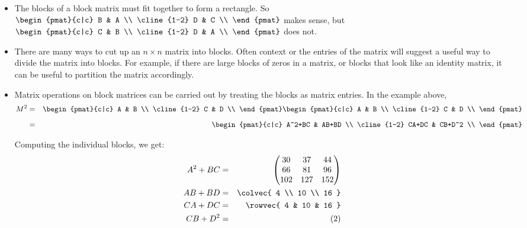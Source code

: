 \begin{itemize}
\item The blocks of a block matrix  must fit together to form a rectangle.  So 
$\begin{pmat}{c|c}
B & A \\
\cline{1-2}
D & C \\
\end{pmat}
$ makes sense, but 
$\begin{pmat}{c|c}
C & B \\
\cline{1-2}
D & A \\
\end{pmat}
$ does not.


\item There are many ways to cut up an $n\times n$ matrix into blocks.  Often context or the entries of the matrix will suggest a useful way to divide the matrix into blocks.  For example, if there are large blocks of zeros in a matrix, or blocks that look like an identity matrix, it can be useful to partition the matrix accordingly.

\item Matrix operations on block matrices can be carried out by treating the blocks as matrix entries.  In the example above,
\begin{eqnarray*}
M^2 & = & \begin{pmat}{c|c}
A & B \\
\cline{1-2}
C & D \\
\end{pmat}
\begin{pmat}{c|c}
A & B \\
\cline{1-2}
C & D \\
\end{pmat} \\[2mm]
& = & \begin{pmat}{c|c}
A^2+BC & AB+BD \\
\cline{1-2}
CA+DC & CB+D^2 \\
\end{pmat} \\
\end{eqnarray*}

Computing the individual blocks, we get:
\begin{eqnarray*}
A^2+BC &=& \begin{pmatrix}
	30 & 37 & 44 \\
	66 & 81 & 96 \\
	102&127 &152 \\
	\end{pmatrix} \\
AB+BD  &=& \colvec{ 4 \\ 10 \\ 16 } \\
CA+DC  &=& \rowvec{ 4 & 10 & 16 } \\
CB+D^2 &=& (2) 
\end{eqnarray*}


\end{itemize}

